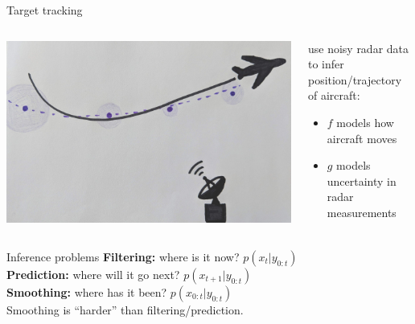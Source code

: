 \documentclass[aspectratio=169]{beamer}
\theoremstyle{definition}
\begin{document}
\begin{frame}{Target tracking}
\begin{columns}
\begin{column}{0.6\textwidth}
\includegraphics[width=\textwidth]{../tracking.jpg}
\end{column}
\begin{column}{0.35\textwidth}
use noisy radar data to infer position/trajectory of aircraft:
\begin{itemize}
\item $f$ models how aircraft moves
\item $g$ models uncertainty in radar measurements
\end{itemize}
\end{column}
\end{columns}
\end{frame}

\begin{frame}{Inference problems}
\textbf{Filtering:} where is it now? $p(x_{t} | y_{0:t})$\\[7pt]
\textbf{Prediction:} where will it go next? $p(x_{t+1} | y_{0:t})$\\[7pt]
\textbf{Smoothing:} where has it been? $p(x_{0:t} | y_{0:t})$\\[12pt]

Smoothing is ``harder'' than filtering/prediction. 
\end{frame}
\end{document}
